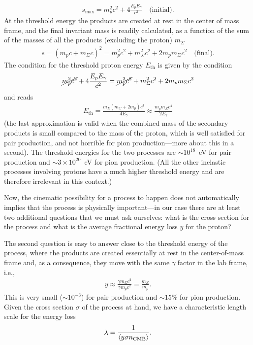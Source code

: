 \begin{align*}
  s_\text{max} = m_p^2 c^2 + 4 \frac{E_p E_\gamma}{c^2} \quad\text{(initial)}.
\end{align*}
At the threshold energy the products are created at rest in the center of mass
frame, and the final invariant mass is readily calculated, as a function of the
sum of the masses of all the products (excluding the proton) $m_\Sigma$
\begin{align*}
  s = (m_p c + m_\Sigma c)^2 =
  m_p^2 c^2 + m_\Sigma^2 c^2 + 2 m_p m_\Sigma c^2 \quad\text{(final)}.
\end{align*}
The condition for the threshold proton energy $E_\text{th}$ is given by the condition
\begin{align*}
  \cancel{m_p^2 c^2} + 4 \frac{E_p E_\gamma}{c^2} =
  \cancel{m_p^2 c^2} + m_\Sigma^2c^2 + 2 m_p m_\Sigma c^2
\end{align*}
and reads
\begin{align}
  E_\text{th} = \frac{m_\Sigma (m_\Sigma + 2 m_p) c^4}{4E_\gamma} \approx
  \frac{m_p m_\Sigma c^4}{2E_\gamma}
\end{align}
(the last approximation is valid when the combined mass of the secondary products
is small compared to the mass of the proton, which is well satisfied for pair
production, and not horrible for pion production---more about this in a second).
The threshold energies for the two processes are $\sim 10^{18}$~eV for pair production
and $\sim 3 \times 10^{20}$~eV for pion production. (All the other inelastic processes
involving protons have a much higher threshold energy and are therefore irrelevant
in this context.)

Now, the cinematic possibility for a process to happen does not automatically implies
that the process is physically important---in our case there are at least two
additional questions that we must ask ourselves: what is the cross section for the
process and what is the average fractional energy loss $y$ for the proton?

The second question is easy to answer close to the threshold energy of the process,
where the products are created essentially at rest in the center-of-mass frame and,
as a consequence, they move with the same $\gamma$ factor in the lab frame, i.e.,
\begin{align}
  y \approx \frac{\gamma m_\Sigma c^2}{\gamma m_p c^2} = \frac{m_\Sigma}{m_p}.
\end{align}
This is very small ($\sim 10^{-3}$) for pair production and $\sim 15\%$ for pion
production. Given the cross section $\sigma$ of the process at hand, we have a
characteristic length scale for the energy loss
\begin{align}
  \lambda = \frac{1}{\left<y \sigma n_\text{CMB}\right>}.
\end{align}



